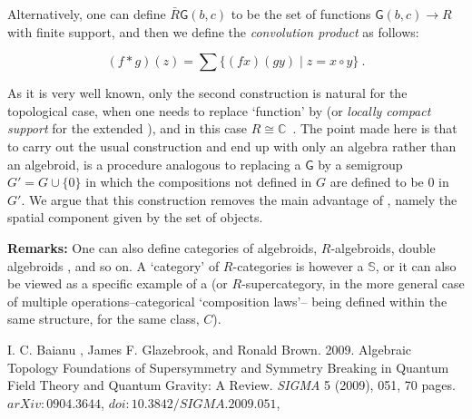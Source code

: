 \documentclass[12pt]{article}
\theoremstyle{plain}
\theoremstyle{definition}
\numberwithin{equation}{section}
\newcommand{\lra}{{\longrightarrow}}
\newcommand{\<}{{\langle}}
\begin{document}
 Alternatively, one can define $\bar{R}\mathsf{G}(b,c)$ to be the
set of functions $\mathsf{G}(b,c)\lra R$ with finite support, and
then we define the \emph{convolution product} as follows:

\begin{equation}
(f*g)(z)= \sum \{(fx)(gy)\mid z=x\circ y \} ~.
\end{equation}

As it is very well known, only the second construction is natural
for the topological case, when one needs to replace `function' by
 (or \emph{locally
compact support} for the  extended 
), and in
this case $R \cong \mathbb{C}$~. The point made here is
that to carry out the usual construction and end up with only an algebra
rather than an algebroid, is a procedure analogous to replacing a
 $\mathsf{G}$ by a semigroup $G'=G\cup \{0\}$ in which the
compositions not defined in $G$ are defined to be $0$ in $G'$. We
argue that this construction removes the main advantage of
, namely the spatial component given by the set of
objects.

\textbf{Remarks:}
One can also define categories of algebroids, $R$-algebroids, double algebroids , and so on.
A `category' of $R$-categories is however a  $\mathbb{S}$, or it can also be viewed as a specific example of a  (or 
$R$-supercategory, in the more general case of multiple operations--categorical `composition laws'-- being defined within the same structure, for the same class, $C$).  


\begin{thebibliography}{9}
I. C. Baianu , James F. Glazebrook, and Ronald Brown. 2009. Algebraic Topology Foundations of Supersymmetry and Symmetry Breaking in Quantum Field Theory and Quantum Gravity: A Review. \emph{SIGMA} 5 (2009), 051, 70 pages.      $arXiv:0904.3644$, $doi:10.3842/SIGMA.2009.051$, 
\end{thebibliography}

\end{document}
